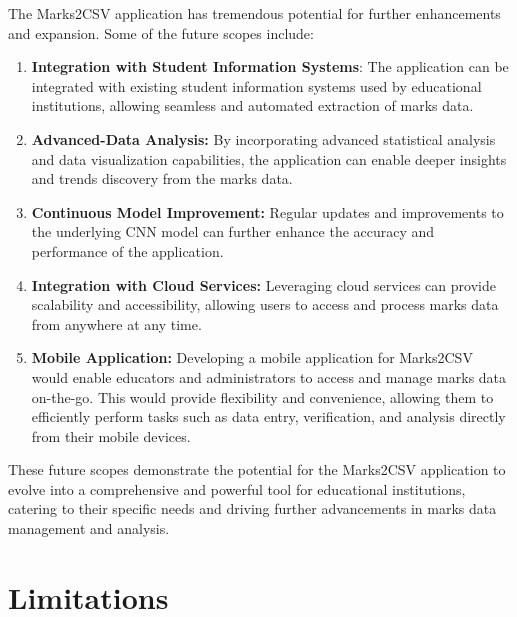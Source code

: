 The Marks2CSV application has tremendous potential for further enhancements and expansion. Some of the future scopes include:
\begin{enumerate}
\item \textbf{Integration with Student Information Systems}: The application can be integrated with existing student information systems used by educational institutions, allowing seamless and automated extraction of marks data.

\item \textbf{Advanced-Data Analysis:} By incorporating advanced statistical analysis and data visualization capabilities, the application can enable deeper insights and trends discovery from the marks data.

\item \textbf{Continuous Model Improvement:} Regular updates and improvements to the underlying CNN model can further enhance the accuracy and performance of the application.

\item \textbf{Integration with Cloud Services:} Leveraging cloud services can provide scalability and accessibility, allowing users to access and process marks data from anywhere at any time.

\item \textbf{Mobile Application:} Developing a mobile application for Marks2CSV would enable educators and administrators to access and manage marks data on-the-go. This would provide flexibility and convenience, allowing them to efficiently perform tasks such as data entry, verification, and analysis directly from their mobile devices.
\end{enumerate}
These future scopes demonstrate the potential for the Marks2CSV application to evolve into a comprehensive and powerful tool for educational institutions, catering to their specific needs and driving further advancements in marks data management and analysis.

\clearpage

\section{Limitations}


